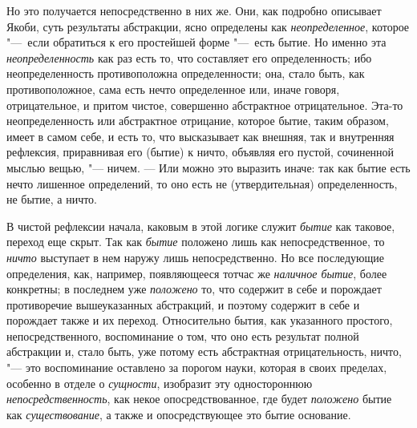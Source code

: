 Но это получается непосредственно в них же. Они, как подробно описывает
Якоби, суть результаты абстракции, ясно определены как
{\em неопределенное}, которое "---~если обратиться к его
простейшей форме "---~есть бытие. Но именно эта
{\em неопределенность} как раз есть то, что составляет
его определенность; ибо неопределенность противоположна определенности;
она, стало быть, как противоположное, сама есть нечто определенное или,
иначе говоря, отрицательное, и притом чистое, совершенно абстрактное
отрицательное. Эта-то неопределенность или абстрактное отрицание, которое
бытие, таким образом, имеет в самом себе, и есть то, что высказывает как
внешняя, так и внутренняя рефлексия, приравнивая его (бытие) к ничто,
объявляя его пустой, сочиненной мыслью вещью, "--- ничем. --- Или можно это
выразить иначе: так как бытие есть нечто лишенное определений, то оно есть
не (утвердительная) определенность, не бытие, а ничто.

В чистой рефлексии начала, каковым в этой логике служит
{\em бытие} как таковое, переход еще скрыт. Так как
{\em бытие} положено лишь как непосредственное, то
{\em ничто} выступает в нем наружу лишь
непосредственно. Но все последующие определения, как, например,
появляющееся тотчас же {\em наличное бытие}, более
конкретны; в последнем уже {\em положено} то, что
содержит в себе и порождает противоречие вышеуказанных абстракций, и
поэтому содержит в себе и порождает также и их переход. Относительно бытия,
как указанного простого, непосредственного, воспоминание о том, что оно
есть результат полной абстракции и, стало быть, уже потому есть абстрактная
отрицательность, ничто, "--- это воспоминание оставлено за порогом науки,
которая в своих пределах, особенно в отделе о
{\em сущности}, изобразит эту одностороннюю
{\em непосредственность}, как некое опосредствованное,
где будет {\em положено} бытие как
{\em существование}, а также и опосредствующее это
бытие основание.

